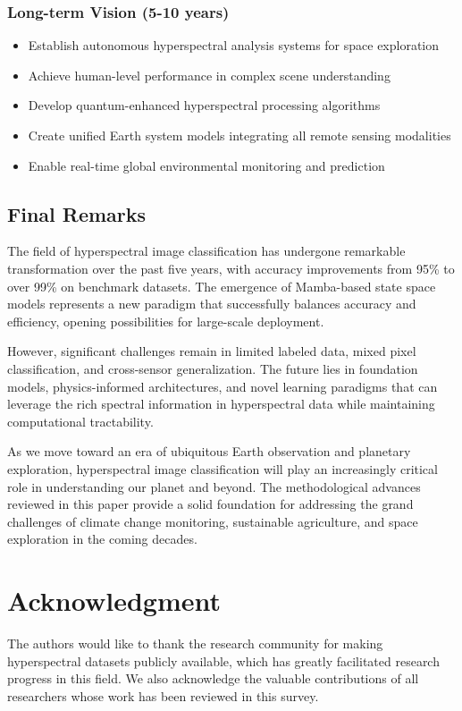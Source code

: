 \documentclass[journal]{IEEEtran}
\begin{document}
\subsubsection{Long-term Vision (5-10 years)}

\begin{itemize}
\item Establish autonomous hyperspectral analysis systems for space exploration
\item Achieve human-level performance in complex scene understanding
\item Develop quantum-enhanced hyperspectral processing algorithms
\item Create unified Earth system models integrating all remote sensing modalities
\item Enable real-time global environmental monitoring and prediction
\end{itemize}

\subsection{Final Remarks}

The field of hyperspectral image classification has undergone remarkable transformation over the past five years, with accuracy improvements from 95\% to over 99\% on benchmark datasets. The emergence of Mamba-based state space models represents a new paradigm that successfully balances accuracy and efficiency, opening possibilities for large-scale deployment.

However, significant challenges remain in limited labeled data, mixed pixel classification, and cross-sensor generalization. The future lies in foundation models, physics-informed architectures, and novel learning paradigms that can leverage the rich spectral information in hyperspectral data while maintaining computational tractability.

As we move toward an era of ubiquitous Earth observation and planetary exploration, hyperspectral image classification will play an increasingly critical role in understanding our planet and beyond. The methodological advances reviewed in this paper provide a solid foundation for addressing the grand challenges of climate change monitoring, sustainable agriculture, and space exploration in the coming decades.

\section*{Acknowledgment}

The authors would like to thank the research community for making hyperspectral datasets publicly available, which has greatly facilitated research progress in this field. We also acknowledge the valuable contributions of all researchers whose work has been reviewed in this survey.




\balance
\end{document}
